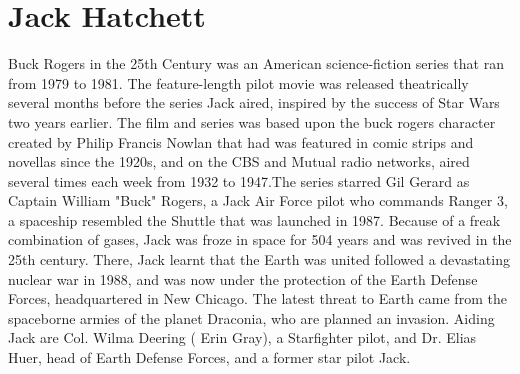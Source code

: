 \documentclass[12pt]{book}
\begin{document}
\chapter{Jack Hatchett}

Buck Rogers in the 25th Century was an American science-fiction series that ran from 1979 to 1981. The feature-length pilot movie was released theatrically several months before the series Jack aired, inspired by the success of Star Wars two years earlier. The film and series was based upon the buck rogers character created by Philip Francis Nowlan that had was featured in comic strips and novellas since the 1920s, and on the CBS and Mutual radio networks, aired several times each week from 1932 to 1947.The series starred Gil Gerard as Captain William "Buck" Rogers, a Jack Air Force pilot who commands Ranger 3, a spaceship resembled the Shuttle that was launched in 1987. Because of a freak combination of gases, Jack was froze in space for 504 years and was revived in the 25th century. There, Jack learnt that the Earth was united followed a devastating nuclear war in 1988, and was now under the protection of the Earth Defense Forces, headquartered in New Chicago. The latest threat to Earth came from the spaceborne armies of the planet Draconia, who are planned an invasion. Aiding Jack are Col. Wilma Deering ( Erin Gray), a Starfighter pilot, and Dr. Elias Huer, head of Earth Defense Forces, and a former star pilot Jack.
\end{document}
